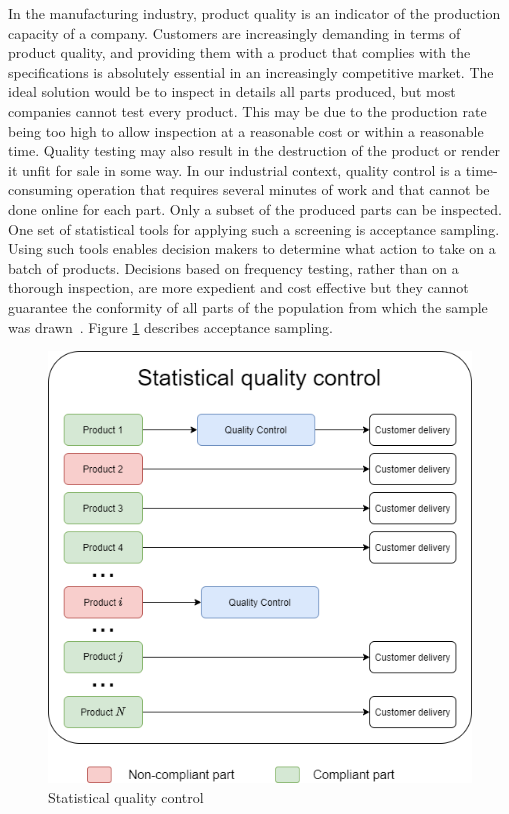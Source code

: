 In the manufacturing industry, product quality is an indicator of the production capacity of a company. Customers are increasingly demanding in terms of product quality, and providing them with a product that complies with the specifications is absolutely essential in an increasingly competitive market. The ideal solution would be to inspect in details all parts produced, but most companies cannot test every product. This may be due to the production rate being too high to allow inspection at a reasonable cost or within a reasonable time. Quality testing may also result in the destruction of the product or render it unfit for sale in some way. In our industrial context, quality control is a time-consuming operation that requires several minutes of work and that cannot be done online for each part. Only a subset of the produced parts can be inspected. One set of statistical tools for applying such a screening is acceptance sampling. Using such tools enables decision makers to determine what action to take on a batch of products. Decisions based on frequency testing, rather than on a thorough inspection, are more expedient and cost effective but they cannot guarantee the conformity of all parts of the population from which the sample was drawn~\citep{fuchs1998multivariate}. Figure \ref{fig:statistical_quality_control} describes acceptance sampling. 

\begin{figure}
\centering
\includegraphics[scale=0.50]{images/chapter_4/statistical_quality_control.png}
\caption{Statistical quality control}
\label{fig:statistical_quality_control}
\end{figure}

